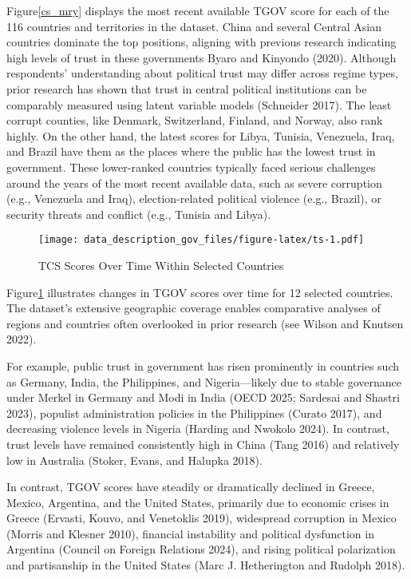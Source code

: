 \documentclass[
  12pt,
]{article}
\begin{document}
Figure\nobreakspace{}\ref{cs_mry} displays the most recent available TGOV score for each of the 116 countries and territories in the dataset.
China and several Central Asian countries dominate the top positions, aligning with previous research indicating high levels of trust in these governments Byaro and Kinyondo (2020).
Although respondents' understanding about political trust may differ across regime types, prior research has shown that trust in central political institutions can be comparably measured using latent variable models (Schneider 2017).
The least corrupt counties, like Denmark, Switzerland, Finland, and Norway, also rank highly.
On the other hand, the latest scores for Libya, Tunisia, Venezuela, Iraq, and Brazil have them as the places where the public has the lowest trust in government.
These lower-ranked countries typically faced serious challenges around the years of the most recent available data, such as severe corruption (e.g., Venezuela and Iraq), election-related political violence (e.g., Brazil), or security threats and conflict (e.g., Tunisia and Libya).

\begin{figure}
\centering
\texttt{[image: data\_description\_gov\_files/figure-latex/ts-1.pdf]}
\caption{\label{fig:ts}TCS Scores Over Time Within Selected Countries \label{ts_plots}}
\end{figure}

Figure\nobreakspace{}\ref{ts_plots} illustrates changes in TGOV scores over time for 12 selected countries.
The dataset's extensive geographic coverage enables comparative analyses of regions and countries often overlooked in prior research (see Wilson and Knutsen 2022).

For example, public trust in government has risen prominently in countries such as Germany, India, the Philippines, and Nigeria---likely due to stable governance under Merkel in Germany and Modi in India (OECD 2025; Sardesai and Shastri 2023), populist administration policies in the Philippines (Curato 2017), and decreasing violence levels in Nigeria (Harding and Nwokolo 2024).
In contrast, trust levels have remained consistently high in China (Tang 2016) and relatively low in Australia (Stoker, Evans, and Halupka 2018).

In contrast, TGOV scores have steadily or dramatically declined in Greece, Mexico, Argentina, and the United States, primarily due to economic crises in Greece (Ervasti, Kouvo, and Venetoklis 2019), widespread corruption in Mexico (Morris and Klesner 2010), financial instability and political dysfunction in Argentina (Council on Foreign Relations 2024), and rising political polarization and partisanship in the United States (Marc J. Hetherington and Rudolph 2018).
\end{document}
